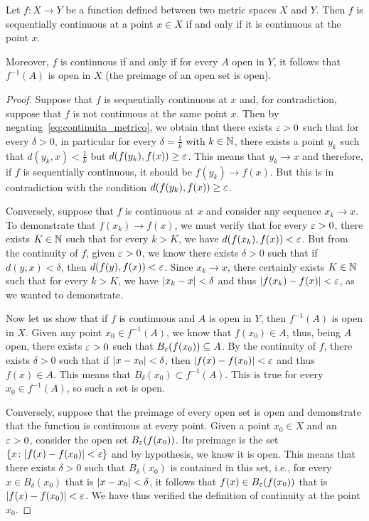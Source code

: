 \begin{theorem}
Let $f\colon X \to Y$ be a function defined between two metric spaces $X$ and
$Y$.
Then $f$ is sequentially continuous at a point $x\in X$ if and only if it is
continuous at the point $x$.

Moreover, $f$ is continuous if and only if
for every $A$ open in $Y$, it follows that $f^{-1}(A)$ is open in $X$
(the preimage of an open set is open).
\end{theorem}
%
\begin{proof}
Suppose that $f$ is sequentially continuous at $x$
and, for contradiction, suppose that $f$ is not continuous at the same point
$x$.
Then by negating~\eqref{eq:continuita_metrico}, we obtain that there exists
$\varepsilon>0$
such that for every $\delta>0$, in particular for every $\delta = \frac{1}{k}$
with $k\in {\mathbb N}$, there exists a point $y_k$ such that $d(y_k,x)<\frac 1 k$ but
$d(f(y_k),f(x))\ge \varepsilon$. This means that $y_k \to x$ and therefore,
if $f$ is sequentially continuous, it should be $f(y_k)\to f(x)$. But
this is in contradiction with the condition $d(f(y_k),f(x))\ge \varepsilon$.

Conversely, suppose that $f$ is continuous at $x$ and consider any
sequence $x_k \to x$.
To demonstrate that $f(x_k)\to f(x)$, we must verify that for every
$\varepsilon>0$, there exists $K\in {\mathbb N}$ such that for every $k>K$, we have
$d(f(x_k),f(x)) < \varepsilon$.
But from the continuity of $f$, given $\varepsilon>0$, we know there exists $\delta>0$
such that
if $d(y,x)<\delta$, then $d(f(y),f(x))<\varepsilon$. Since $x_k\to x$,
there certainly exists $K\in {\mathbb N}$ such that for every $k>K$, we have
${\left|x_k-x\right|}<\delta$
and thus ${\left|f(x_k)-f(x)\right|}< \varepsilon$, as we wanted to demonstrate.

Now let us show that if $f$ is continuous and $A$ is open in $Y$, then
$f^{-1}(A)$
is open in $X$.
Given any point $x_0\in f^{-1}(A)$, we know that $f(x_0)\in A$, thus, being
$A$ open, there exists $\varepsilon>0$ such that $B_\varepsilon(f(x_0))\subseteq A$.
By the continuity of $f$, there exists $\delta>0$ such that if ${\left|x-x_0\right|} <
\delta$,
then ${\left|f(x)-f(x_0)\right|}<\varepsilon$ and thus $f(x)\in A$. This means that
$B_\delta(x_0)\subset f^{-1}(A)$.
This is true for every $x_0\in f^{-1}(A)$, so such a set is open.

Conversely, suppose that the preimage of every open set is open and
demonstrate that the function is continuous at every point.
Given a point $x_0\in X$ and an $\varepsilon>0$, consider the open set
$B_\varepsilon(f(x_0))$.
Its preimage is the set ${\left\{ x\colon {\left|f(x)-f(x_0)\right|} < \varepsilon \right\}}$ and
by hypothesis, we know it is open. This means that there exists $\delta>0$
such that $B_\delta(x_0)$ is contained in this set, i.e., for every $x\in
B_\delta(x_0)$
that is ${\left|x-x_0\right|}<\delta$,
it follows that $f(x) \in B_\varepsilon(f(x_0))$
that is ${\left|f(x)-f(x_0)\right|}<\varepsilon$.
We have thus verified the definition of
continuity at the point $x_0$.
\end{proof}

